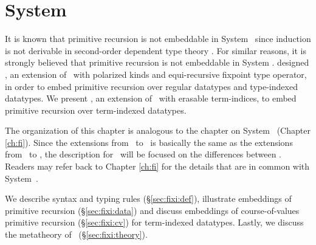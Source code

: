 \chapter{System \Fixi}\label{ch:fixi}

It is known that primitive recursion is not embeddable in System \F\ since
induction is not derivable in second-order dependent type theory
\cite{Geuvers01}. For similar reasons, it is strongly believed that
primitive recursion is not embeddable in System \Fw. 
\citet{AbeMat04} designed \Fixw, an extension of \Fw\ with polarized kinds and
equi-recursive fixpoint type operator, in order to embed primitive recursion
over regular datatypes and type-indexed datatypes.
We present \Fixi, an extension of \Fixw\ with erasable term-indices,
to embed primitive recursion over term-indexed datatypes.

The organization of this chapter is analogous to the chapter on System \Fi\
(Chapter \ref{ch:fi}). Since the extensions from \Fixw\ to \Fixi\ is
basically the same as the extensions from \Fw\ to \Fi,
the description for \Fixi\ will be focused on the differences between \Fi.
Readers may refer back to Chapter \ref{ch:fi} for the details that are
in common with System~\Fi.

We describe syntax and typing rules (\S\ref{sec:fixi:def}),
illustrate embeddings of primitive recursion (\S\ref{sec:fixi:data})
and discuss embeddings of course-of-values primitive recursion
(\S\ref{sec:fixi:cv}) for term-indexed datatypes. Lastly, we
discuss the metatheory of \Fixi\ (\S\ref{sec:fixi:theory}).





